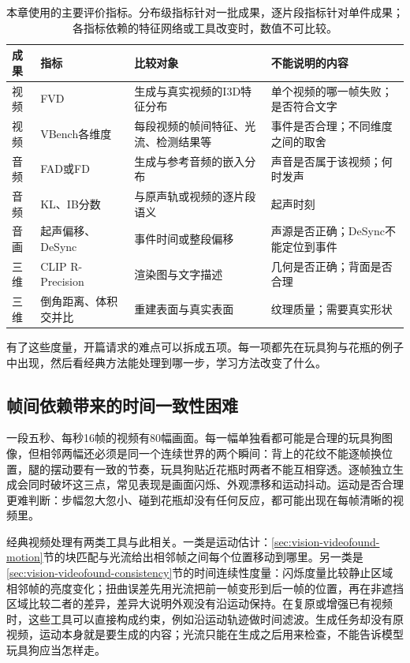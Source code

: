 \begin{table}[tbp]
 \centering
 \small
 \begin{tabularx}{\linewidth}{@{}p{20mm}p{30mm}p{34mm}X@{}}
  \toprule
  成果 & 指标 & 比较对象 & 不能说明的内容 \\
  \midrule
  视频 & FVD & 生成与真实视频的I3D特征分布 & 单个视频的哪一帧失败；是否符合文字 \\
  视频 & VBench各维度 & 每段视频的帧间特征、光流、检测结果等 & 事件是否合理；不同维度之间的取舍 \\
  音频 & FAD或FD & 生成与参考音频的嵌入分布 & 声音是否属于该视频；何时发声 \\
  音频 & KL、IB分数 & 与原声轨或视频的逐片段语义 & 起声时刻 \\
  音画 & 起声偏移、DeSync & 事件时间或整段偏移 & 声源是否正确；DeSync不能定位到事件 \\
  三维 & CLIP R-Precision & 渲染图与文字描述 & 几何是否正确；背面是否合理 \\
  三维 & 倒角距离、体积交并比 & 重建表面与真实表面 & 纹理质量；需要真实形状 \\
  \bottomrule
 \end{tabularx}
 \caption{本章使用的主要评价指标。分布级指标针对一批成果，逐片段指标针对单件成果；各指标依赖的特征网络或工具改变时，数值不可比较。}
 \label{tab:vision-multigen-metrics}
\end{table}
\FloatBarrier

有了这些度量，开篇请求的难点可以拆成五项。每一项都先在玩具狗与花瓶的例子中出现，然后看经典方法能处理到哪一步，学习方法改变了什么。

\subsection{帧间依赖带来的时间一致性困难}
\label{sec:vision-multigen-challenge-temporal}

一段五秒、每秒16帧的视频有80幅画面。每一幅单独看都可能是合理的玩具狗图像，但相邻两幅还必须是同一个连续世界的两个瞬间：背上的花纹不能逐帧换位置，腿的摆动要有一致的节奏，玩具狗贴近花瓶时两者不能互相穿透。逐帧独立生成会同时破坏这三点，常见表现是画面闪烁、外观漂移和运动抖动。运动是否合理更难判断：步幅忽大忽小、碰到花瓶却没有任何反应，都可能出现在每帧清晰的视频里。

经典视频处理有两类工具与此相关。一类是运动估计：\ref{sec:vision-videofound-motion}节的块匹配与光流给出相邻帧之间每个位置移动到哪里。另一类是\ref{sec:vision-videofound-consistency}节的时间连续性度量：闪烁度量比较静止区域相邻帧的亮度变化；扭曲误差先用光流把前一帧变形到后一帧的位置，再在非遮挡区域比较二者的差异，差异大说明外观没有沿运动保持。在复原或增强已有视频时，这些工具可以直接构成约束，例如沿运动轨迹做时间滤波。生成任务却没有原视频，运动本身就是要生成的内容；光流只能在生成之后用来检查，不能告诉模型玩具狗应当怎样走。

